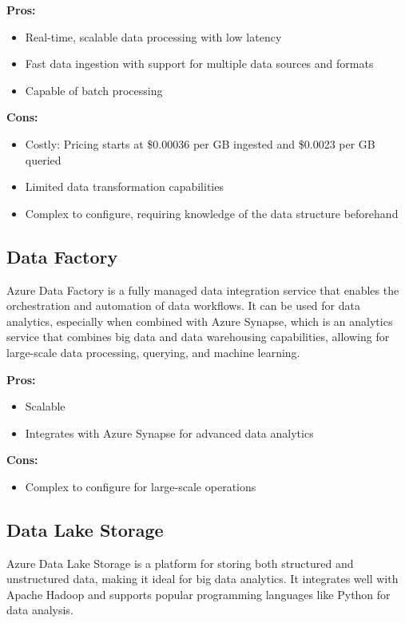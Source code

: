 \textbf{Pros:}
\begin{itemize}
    \item Real-time, scalable data processing with low latency
    \item Fast data ingestion with support for multiple data sources and formats
    \item Capable of batch processing
\end{itemize}

\textbf{Cons:}
\begin{itemize}
    \item Costly: Pricing starts at \$0.00036 per GB ingested and \$0.0023 per GB queried
    \item Limited data transformation capabilities
    \item Complex to configure, requiring knowledge of the data structure beforehand
\end{itemize}

\subsection*{Data Factory}
\label{azure:data-factory}
Azure Data Factory is a fully managed data integration service that enables the orchestration and automation of data workflows. It can be used for data analytics, especially when combined with Azure Synapse, which is an analytics service that combines big data and data warehousing capabilities, allowing for large-scale data processing, querying, and machine learning.

\textbf{Pros:}
\begin{itemize}
    \item Scalable
    \item Integrates with Azure Synapse for advanced data analytics
\end{itemize}

\textbf{Cons:}
\begin{itemize}
    \item Complex to configure for large-scale operations
\end{itemize}


\subsection*{Data Lake Storage}
\label{azure:data-lake-storage}
Azure Data Lake Storage is a platform for storing both structured and unstructured data, making it ideal for big data analytics. It integrates well with Apache Hadoop and supports popular programming languages like Python for data analysis.


